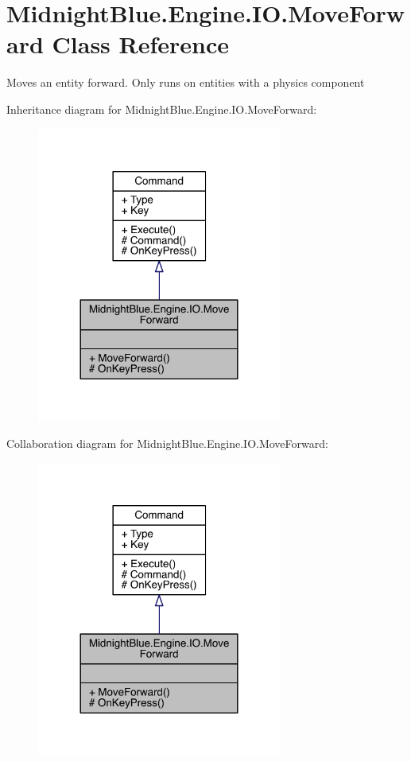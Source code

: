\hypertarget{class_midnight_blue_1_1_engine_1_1_i_o_1_1_move_forward}{}\section{Midnight\+Blue.\+Engine.\+I\+O.\+Move\+Forward Class Reference}
\label{class_midnight_blue_1_1_engine_1_1_i_o_1_1_move_forward}


Moves an entity forward. Only runs on entities with a physics component  




Inheritance diagram for Midnight\+Blue.\+Engine.\+I\+O.\+Move\+Forward\+:
\nopagebreak
\begin{figure}[H]
\begin{center}
\leavevmode
\includegraphics[width=228pt]{class_midnight_blue_1_1_engine_1_1_i_o_1_1_move_forward__inherit__graph}
\end{center}
\end{figure}


Collaboration diagram for Midnight\+Blue.\+Engine.\+I\+O.\+Move\+Forward\+:
\nopagebreak
\begin{figure}[H]
\begin{center}
\leavevmode
\includegraphics[width=228pt]{class_midnight_blue_1_1_engine_1_1_i_o_1_1_move_forward__coll__graph}
\end{center}
\end{figure}

